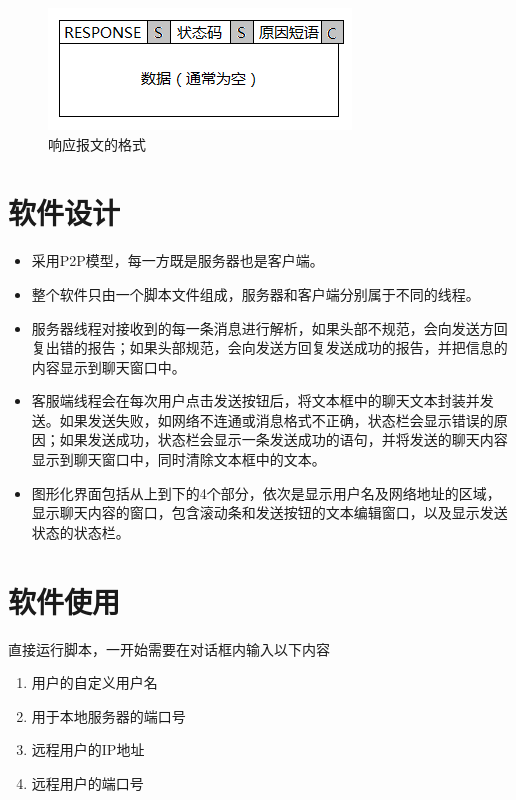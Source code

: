 \documentclass[a4paper, nofonts, nocap]{ctexart}
\begin{document}
\begin{figure}[ht]
	\centering
	\includegraphics{images/response.png}
	\caption{响应报文的格式}
\end{figure}

\section{软件设计}
\begin{itemize}
	\item 采用P2P模型，每一方既是服务器也是客户端。
	\item 整个软件只由一个脚本文件组成，服务器和客户端分别属于不同的线程。
	\item 服务器线程对接收到的每一条消息进行解析，如果头部不规范，会向发送方回复出错的报告；如果头部规范，会向发送方回复发送成功的报告，并把信息的内容显示到聊天窗口中。
	\item 客服端线程会在每次用户点击发送按钮后，将文本框中的聊天文本封装并发送。如果发送失败，如网络不连通或消息格式不正确，状态栏会显示错误的原因；如果发送成功，状态栏会显示一条发送成功的语句，并将发送的聊天内容显示到聊天窗口中，同时清除文本框中的文本。
	\item 图形化界面包括从上到下的4个部分，依次是显示用户名及网络地址的区域，显示聊天内容的窗口，包含滚动条和发送按钮的文本编辑窗口，以及显示发送状态的状态栏。
\end{itemize}

\section{软件使用}
直接运行脚本，一开始需要在对话框内输入以下内容
\begin{enumerate}
	\setlength{\itemindent}{2em}
	\item 用户的自定义用户名
	\item 用于本地服务器的端口号
	\item 远程用户的IP地址
	\item 远程用户的端口号
\end{enumerate}
\end{document}
